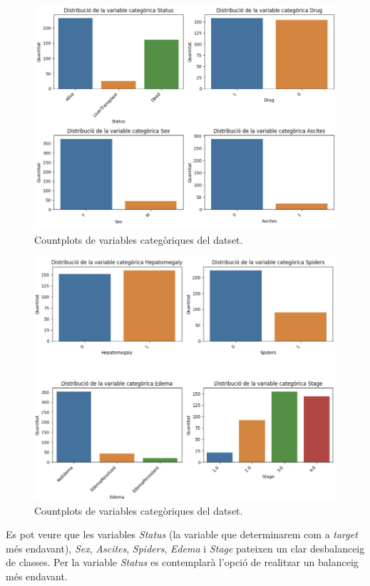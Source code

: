 \begin{figure}[H]
    \centering
    \includegraphics[width=\linewidth]{img/cat-countplots-1.png}
    \caption{Countplots de variables categòriques del datset.}
    \label{fig:cat-countplots-1}
\end{figure}
\begin{figure}[H]
    \centering
    \includegraphics[width=\linewidth]{img/cat-countplots-2.png}
    \caption{Countplots de variables categòriques del datset.}
    \label{fig:cat-countplots-2}
\end{figure}

Es pot veure que les variables \textit{Status} (la variable que determinarem com a \textit{target} més endavant), \textit{Sex}, \textit{Ascites}, \textit{Spiders}, \textit{Edema} i \textit{Stage} pateixen un clar desbalanceig de classes. Per la variable \textit{Status} es contemplarà l'opció de realitzar un balanceig més endavant.

